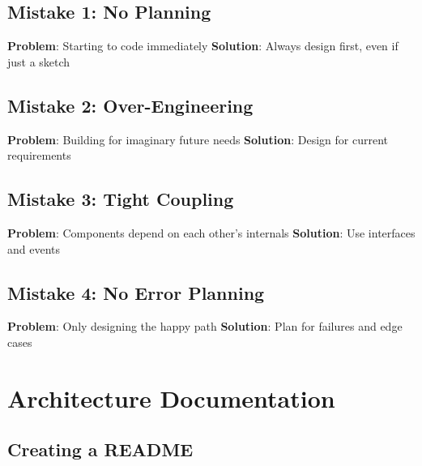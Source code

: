 \documentclass[
  letterpaper,
  DIV=11,
  numbers=noendperiod,
  oneside]{scrreprt}
\begin{document}
\subsection{Mistake 1: No Planning}\label{mistake-1-no-planning}

\textbf{Problem}: Starting to code immediately \textbf{Solution}: Always
design first, even if just a sketch

\subsection{Mistake 2:
Over-Engineering}\label{mistake-2-over-engineering}

\textbf{Problem}: Building for imaginary future needs \textbf{Solution}:
Design for current requirements

\subsection{Mistake 3: Tight Coupling}\label{mistake-3-tight-coupling}

\textbf{Problem}: Components depend on each other's internals
\textbf{Solution}: Use interfaces and events

\subsection{Mistake 4: No Error
Planning}\label{mistake-4-no-error-planning}

\textbf{Problem}: Only designing the happy path \textbf{Solution}: Plan
for failures and edge cases

\section{Architecture Documentation}\label{architecture-documentation}

\subsection{Creating a README}\label{creating-a-readme}
\end{document}
